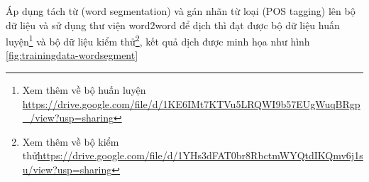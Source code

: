 \begin{table}[H]
\begin{center}

\end{center}
\caption{Danh sách cách POS tags phổ biến}
    \label{fig:Part-Of-Speech (POS) tags}
\end{table}

Áp dụng tách từ (word segmentation) và gán nhãn từ loại (POS tagging) lên bộ dữ liệu và sử dụng thư viện word2word để dịch thì đạt được bộ dữ liệu huấn luyện\footnote{Xem thêm về bộ huấn luyện \url{https://drive.google.com/file/d/1KE6IMt7KTVu5LRQWI9b57EUgWuqBRgp_/view?usp=sharing}} và bộ dữ liệu kiểm thử\footnote{Xem thêm về bộ kiểm thử\url{https://drive.google.com/file/d/1YHs3dFAT0br8RbctmWYQtdIKQmv6j1su/view?usp=sharing}}, kết quả dịch được minh họa như hình \ref{fig:trainingdata-wordsegment}

